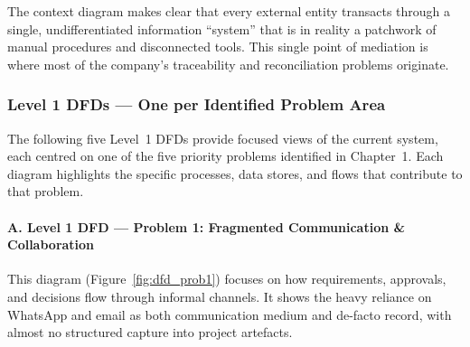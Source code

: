 \documentclass[12pt,a4paper]{report}
\begin{document}
\noindent The context diagram makes clear that every external entity transacts through a single, undifferentiated information ``system'' that is in reality a patchwork of manual procedures and disconnected tools. This single point of mediation is where most of the company's traceability and reconciliation problems originate.

\subsubsection{Level 1 DFDs — One per Identified Problem Area}

The following five Level~1 DFDs provide focused views of the current system, each centred on one of the five priority problems identified in Chapter~1. Each diagram highlights the specific processes, data stores, and flows that contribute to that problem.

\paragraph{A. Level 1 DFD — Problem 1: Fragmented Communication \& Collaboration}

This diagram (Figure~\ref{fig:dfd_prob1}) focuses on how requirements, approvals, and decisions flow through informal channels. It shows the heavy reliance on WhatsApp and email as both communication medium and de-facto record, with almost no structured capture into project artefacts.
\end{document}
